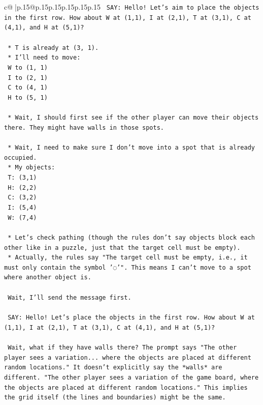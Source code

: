 \documentclass{article}
\begin{document}
{\begin{supertabular}{c@{$\;$}|p{.15\linewidth}@{}p{.15\linewidth}p{.15\linewidth}p{.15\linewidth}p{.15\linewidth}p{.15\linewidth}}
{{{\texttt{    SAY: Hello! Let's aim to place the objects in the first row. How about W at (1,1), I at (2,1), T at (3,1), C at (4,1), and H at (5,1)?} \\
\\ 
\texttt{    *   T is already at (3, 1).} \\
\texttt{    *   I'll need to move:} \\
\texttt{        W to (1, 1)} \\
\texttt{        I to (2, 1)} \\
\texttt{        C to (4, 1)} \\
\texttt{        H to (5, 1)} \\
\\ 
\texttt{    *   Wait, I should first see if the other player can move their objects there. They might have walls in those spots.} \\
\\ 
\texttt{    *   Wait, I need to make sure I don't move into a spot that is already occupied.} \\
\texttt{    *   My objects:} \\
\texttt{        T: (3,1)} \\
\texttt{        H: (2,2)} \\
\texttt{        C: (3,2)} \\
\texttt{        I: (5,4)} \\
\texttt{        W: (7,4)} \\
\\ 
\texttt{    *   Let's check pathing (though the rules don't say objects block each other like in a puzzle, just that the target cell must be empty).} \\
\texttt{    *   Actually, the rules say "The target cell must be empty, i.e., it must only contain the symbol '◌'". This means I can't move to a spot where another object is.} \\
\\ 
\texttt{    Wait, I'll send the message first.} \\
\\ 
\texttt{    SAY: Hello! Let's place the objects in the first row. How about W at (1,1), I at (2,1), T at (3,1), C at (4,1), and H at (5,1)?} \\
\\ 
\texttt{    Wait, what if they have walls there? The prompt says "The other player sees a variation... where the objects are placed at different random locations." It doesn't explicitly say the *walls* are different. "The other player sees a variation of the game board, where the objects are placed at different random locations." This implies the grid itself (the lines and boundaries) might be the same.} \\
}}}
\end{supertabular}}
\end{document}
